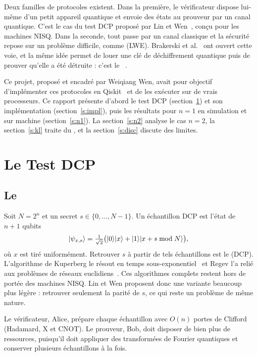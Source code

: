 Deux familles de protocoles existent. Dans la première,
le vérificateur dispose lui-même d'un petit appareil quantique et envoie des états au prouveur par un canal quantique. C'est le cas du test DCP proposé par Lin et Wen~\cite{linwen},
conçu pour les machines NISQ. Dans la seconde, tout
passe par un canal classique et la sécurité repose sur un
problème difficile, comme  (LWE).
Brakerski et al.~\cite{brakerski} ont ouvert cette voie, et la même idée
permet de louer une clé de déchiffrement quantique puis
de prouver qu'elle a été détruite : c'est le ~\cite{chardouvelis,phan}.

Ce projet, proposé et encadré par Weiqiang Wen, avait
pour objectif d'implémenter ces protocoles en Qiskit~\cite{qiskit}
et de les exécuter sur de vrais processeurs. Ce rapport
présente d'abord le test DCP (section~\ref{s:dcp}) et son implémentation (section~\ref{s:impl}), puis les résultats pour $n = 1$ en
simulation et sur machine (section~\ref{s:n1}). La section~\ref{s:n2} analyse le cas $n = 2$, la section~\ref{s:kl} traite du ,
et la section~\ref{s:disc} discute des limites.

\section{Le Test DCP}\label{s:dcp}
\subsection{Le }
Soit $N = 2^n$ et un secret $s \in \{0, \dots, N-1\}$. Un échantillon DCP est l'état de $n+1$ qubits
\begin{equation}
\lvert \psi_{x,s}\rangle = \tfrac{1}{\sqrt 2}\bigl(\lvert 0\rangle\lvert x\rangle + \lvert 1\rangle\lvert x + s \bmod N\rangle\bigr),
\end{equation}
où $x$ est tiré uniformément. Retrouver $s$ à partir de tels
échantillons est le 
(DCP). L'algorithme de Kuperberg le résout en temps
sous-exponentiel~\cite{kuperberg} et Regev l'a relié aux problèmes de
réseaux euclidiens~\cite{regev}. Ces algorithmes complets restent
hors de portée des machines NISQ. Lin et Wen proposent
donc une variante beaucoup plus légère : retrouver seulement la parité de $s$, ce qui reste un problème de même nature.

Le vérificateur, Alice, prépare chaque échantillon avec
$O(n)$ portes de Clifford (Hadamard, X et CNOT). Le
prouveur, Bob, doit disposer de bien plus de ressources,
puisqu'il doit appliquer des transformées de Fourier quantiques et conserver plusieurs échantillons à la fois.

